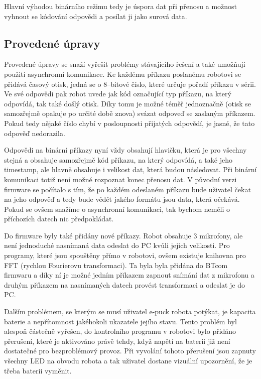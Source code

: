 \documentclass[12pt,notitlepage]{report}
\begin{document}
    Hlavní výhodou binárního režimu tedy je úspora dat při přenosu a možnost
    vyhnout se kódování odpovědi a posílat ji jako surová data.

    \subsection{Provedené úpravy}
    \label{btcom:upravy}

    Provedené úpravy se snaží vyřešit problémy stávajícího řešení a také
    umožňují použití asynchronní komunikace. Ke každému příkazu poslanému
    robotovi se přidává časový otisk, jedná se o 8--bitové číslo, které určuje
    pořadí příkazu v sérii. Ve své odpovědi pak robot uvede jak kód označující
    typ příkazu, na který odpovídá, tak také došlý otisk. Díky tomu je možné
    téměř jednoznačně (otisk se samozřejmě opakuje po určité době znova) svázat
    odpoveď se zaslaným příkazem. Pokud tedy nějaké číslo chybí v posloupnosti
    přijatých odpovědí, je jasné, že tato odpověď nedorazila.

    Odpovědi na binární příkazy nyní vždy obsahují hlavičku, která je pro
    všechny stejná a obsahuje samozřejmě kód příkazu, na který odpovídá, a také
    jeho timestamp, ale hlavně obsahuje i velikost dat, která budou následovat.
    Při binární komunikaci totiž není možné rozpoznat konec přenosu dat. V
    původní verzi firmware se počítalo s tím, že po každém odeslaném příkazu
    bude uživatel čekat na jeho odpověď a tedy bude vědět jakého formátu jsou
    data, která očekává. Pokud se ovšem snažíme o asynchronní komunikaci, tak
    bychom neměli o příchozích datech nic předpokládat.

    Do firmware byly také přidány nové příkazy. Robot obsahuje 3 mikrofony, ale
    není jednoduché nasnímaná data odeslat do PC kvůli jejich velikosti. Pro
    programy, které jsou spouštěny přímo v robotovi, ovšem existuje knihovna
    pro FFT (rychlou Fourierovu transformaci). Ta byla byla přidána do BTcom
    firmwaru a díky ní je možné jedním příkazem zapnout snímání dat z mikrofonu
    a druhým příkazem na nasnímaných datech provést transformaci a odeslat je
    do PC.

    Dalším problémem, se kterým se musí uživatel e-puck robota potýkat, je
    kapacita baterie a nepřítomnost jakéhokoli ukazatele jejího stavu. Tento
    problém byl alespoň částečně vyřešen, do kontrolního programu v robotovi
    bylo přidáno přerušení, které je aktivováno právě tehdy, když napětí na
    baterii již není dostatečné pro bezproblémový provoz. Při vyvolání tohoto
    přerušení jsou zapnuty všechny LED na obvodu robota a tak uživatel dostane
    vizuální upozornění, že je třeba baterii vyměnit.
\end{document}
